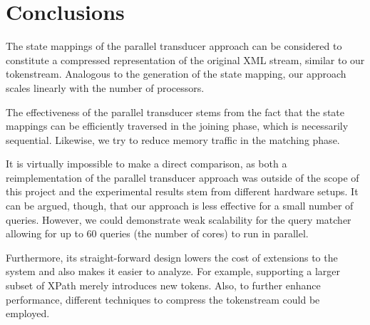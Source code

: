 \section{Conclusions}
The state mappings of the parallel transducer approach can be considered to
constitute a compressed representation of the original XML stream, similar to
our tokenstream. Analogous to the generation of the state mapping, our approach
scales linearly with the number of processors.

The effectiveness of the parallel transducer stems from the fact that the state
mappings can be efficiently traversed in the joining phase, which is necessarily
sequential. Likewise, we try to reduce memory traffic in the matching phase.

It is virtually impossible to make a direct comparison, as both a
reimplementation of the parallel transducer approach was outside of the scope of
this project and the experimental results stem from different hardware setups.
It can be argued, though, that our approach is less effective for a small number
of queries. However, we could demonstrate weak scalability for the query matcher
allowing for up to 60 queries (the number of cores) to run in parallel.

Furthermore, its straight-forward design lowers the cost of extensions to the
system and also makes it easier to analyze. For example, supporting a larger
subset of XPath merely introduces new tokens. Also, to further enhance
performance, different techniques to compress the tokenstream could be employed.



